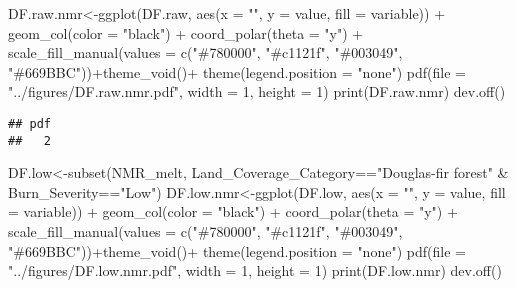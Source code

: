 \documentclass[
]{article}
\newenvironment{Shaded}{\begin{snugshade}}{\end{snugshade}}
\newcommand{\AttributeTok}[1]{\textcolor[rgb]{0.77,0.63,0.00}{#1}}
\newcommand{\DecValTok}[1]{\textcolor[rgb]{0.00,0.00,0.81}{#1}}
\newcommand{\FunctionTok}[1]{\textcolor[rgb]{0.00,0.00,0.00}{#1}}
\newcommand{\NormalTok}[1]{#1}
\newcommand{\OtherTok}[1]{\textcolor[rgb]{0.56,0.35,0.01}{#1}}
\newcommand{\SpecialCharTok}[1]{\textcolor[rgb]{0.00,0.00,0.00}{#1}}
\newcommand{\StringTok}[1]{\textcolor[rgb]{0.31,0.60,0.02}{#1}}
\begin{document}
\begin{Shaded}
\begin{Highlighting}[]
\NormalTok{DF.raw.nmr}\OtherTok{\textless{}{-}}\FunctionTok{ggplot}\NormalTok{(DF.raw, }\FunctionTok{aes}\NormalTok{(}\AttributeTok{x =} \StringTok{""}\NormalTok{, }\AttributeTok{y =}\NormalTok{ value, }\AttributeTok{fill =}\NormalTok{ variable)) }\SpecialCharTok{+}
    \FunctionTok{geom\_col}\NormalTok{(}\AttributeTok{color =} \StringTok{"black"}\NormalTok{) }\SpecialCharTok{+}
    \FunctionTok{coord\_polar}\NormalTok{(}\AttributeTok{theta =} \StringTok{"y"}\NormalTok{) }\SpecialCharTok{+} \FunctionTok{scale\_fill\_manual}\NormalTok{(}\AttributeTok{values =} \FunctionTok{c}\NormalTok{(}\StringTok{"\#780000"}\NormalTok{, }\StringTok{"\#c1121f"}\NormalTok{, }\StringTok{"\#003049"}\NormalTok{, }\StringTok{"\#669BBC"}\NormalTok{))}\SpecialCharTok{+}\FunctionTok{theme\_void}\NormalTok{()}\SpecialCharTok{+}
    \FunctionTok{theme}\NormalTok{(}\AttributeTok{legend.position =} \StringTok{"none"}\NormalTok{)}
\FunctionTok{pdf}\NormalTok{(}\AttributeTok{file =} \StringTok{"../figures/DF.raw.nmr.pdf"}\NormalTok{, }\AttributeTok{width =} \DecValTok{1}\NormalTok{, }\AttributeTok{height =} \DecValTok{1}\NormalTok{) }
\FunctionTok{print}\NormalTok{(DF.raw.nmr)}
\FunctionTok{dev.off}\NormalTok{()}
\end{Highlighting}
\end{Shaded}

\begin{verbatim}
## pdf 
##   2
\end{verbatim}

\begin{Shaded}
\begin{Highlighting}[]
\NormalTok{DF.low}\OtherTok{\textless{}{-}}\FunctionTok{subset}\NormalTok{(NMR\_melt, Land\_Coverage\_Category}\SpecialCharTok{==}\StringTok{"Douglas{-}fir forest"} \SpecialCharTok{\&}\NormalTok{ Burn\_Severity}\SpecialCharTok{==}\StringTok{"Low"}\NormalTok{)}
\NormalTok{DF.low.nmr}\OtherTok{\textless{}{-}}\FunctionTok{ggplot}\NormalTok{(DF.low, }\FunctionTok{aes}\NormalTok{(}\AttributeTok{x =} \StringTok{""}\NormalTok{, }\AttributeTok{y =}\NormalTok{ value, }\AttributeTok{fill =}\NormalTok{ variable)) }\SpecialCharTok{+}
    \FunctionTok{geom\_col}\NormalTok{(}\AttributeTok{color =} \StringTok{"black"}\NormalTok{) }\SpecialCharTok{+}
    \FunctionTok{coord\_polar}\NormalTok{(}\AttributeTok{theta =} \StringTok{"y"}\NormalTok{) }\SpecialCharTok{+} \FunctionTok{scale\_fill\_manual}\NormalTok{(}\AttributeTok{values =} \FunctionTok{c}\NormalTok{(}\StringTok{"\#780000"}\NormalTok{, }\StringTok{"\#c1121f"}\NormalTok{, }\StringTok{"\#003049"}\NormalTok{, }\StringTok{"\#669BBC"}\NormalTok{))}\SpecialCharTok{+}\FunctionTok{theme\_void}\NormalTok{()}\SpecialCharTok{+}
    \FunctionTok{theme}\NormalTok{(}\AttributeTok{legend.position =} \StringTok{"none"}\NormalTok{)}
\FunctionTok{pdf}\NormalTok{(}\AttributeTok{file =} \StringTok{"../figures/DF.low.nmr.pdf"}\NormalTok{, }\AttributeTok{width =} \DecValTok{1}\NormalTok{, }\AttributeTok{height =} \DecValTok{1}\NormalTok{) }
\FunctionTok{print}\NormalTok{(DF.low.nmr)}
\FunctionTok{dev.off}\NormalTok{()}
\end{Highlighting}
\end{Shaded}
\end{document}
